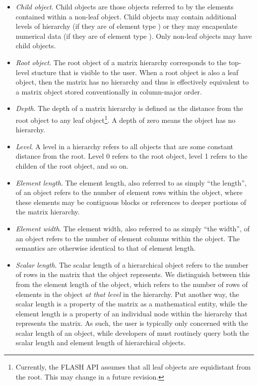\begin{itemize}
\item
{\em Child object}.
Child objects are those objects referred to by the elements contained
within a non-leaf object.
Child objects may contain additional levels of hierarchy (if they are
of element type \flamatrixns) or they may encapsulate numerical data
(if they are of element type \flascalarns).
Only non-leaf objects may have child objects.

\item
{\em Root object}.
The root object of a matrix hierarchy corresponds to the top-level stucture
that is visible to the user.
When a root object is also a leaf object, then the matrix has no hierarchy
and thus is effectively equivalent to a matrix object stored conventionally
in column-major order.

\item
{\em Depth}.
The depth of a matrix hierarchy is defined as the distance from the
root object to any leaf object\footnote{Currently, the FLASH API assumes that
all leaf objects are equidistant from the root. This may change in a future
revision.}.
A depth of zero means the object has no hierarchy. 

\item
{\em Level}.
A level in a hierarchy refers to all objects that are some constant distance
from the root.
Level 0 refers to the root object, level 1 refers to the childen of the root
object, and so on.

\item
{\em Element length}.
The element length, also referred to as simply ``the length'', of an object
refers to the number of element rows within
the object, where these elements may be contiguous blocks or references to
deeper portions of the matrix hierarchy.

\item
{\em Element width}.
The element width, also referred to as simply ``the width'', of an object
refers to the number of element columns within the object.
The semantics are otherwise identical to that of element length.

\item
{\em Scalar length}.
The scalar length of a hierarchical object refers to the number of rows in the
matrix that the object represents.
We distinguish between this from the element length of the object, which refers
to the
number of rows of elements in the object {\em at that level} in the hierarchy.
Put another way, the scalar length is a property of the matrix as a mathematical
entity, while the element length is a property of an individual node within the
hierarchy that represents the matrix.
As such, the user is typically only concerned with the scalar length of an
object, while developers of \libflame must routinely query both the scalar length
and element length of hierarchical objects. 


\end{itemize}
